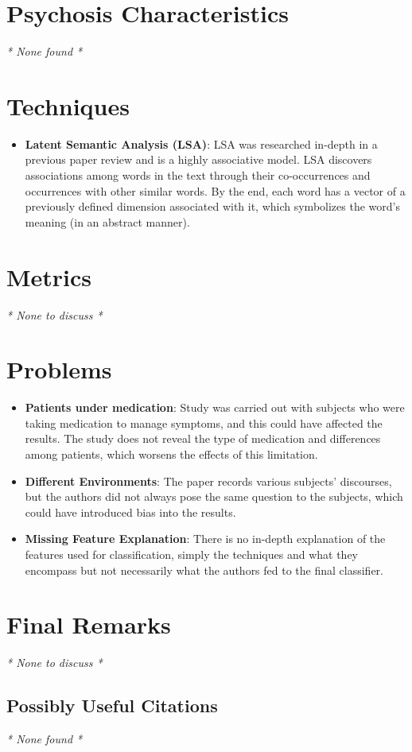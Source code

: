 \documentclass{Paper_Summary}
\begin{document}
\breakline

\newpage

\section{Psychosis Characteristics}
\emph{* None found *}

\section{Techniques}
    \begin{itemize}
        \item \textbf{Latent Semantic Analysis (LSA)}: LSA was researched in-depth in a previous paper review and is a highly associative model. LSA discovers associations among words in the text through their co-occurrences and occurrences with other similar words. By the end, each word has a vector of a previously defined dimension associated with it, which symbolizes the word's meaning (in an abstract manner).
    \end{itemize}

\section{Metrics}
\emph{* None to discuss *}

\section{Problems}
    \begin{itemize}
        \item \textbf{Patients under medication}: Study was carried out with subjects who were taking medication to manage symptoms, and this could have affected the results. The study does not reveal the type of medication and differences among patients, which worsens the effects of this limitation.
        \item \textbf{Different Environments}: The paper records various subjects' discourses, but the authors did not always pose the same question to the subjects, which could have introduced bias into the results.
        \item \textbf{Missing Feature Explanation}: There is no in-depth explanation of the features used for classification, simply the techniques and what they encompass but not necessarily what the authors fed to the final classifier.
    \end{itemize}


\section{Final Remarks}
\emph{* None to discuss *}

\breakline

\begin{center}
    \section*{Possibly Useful Citations}
\end{center}
\emph{* None found *}
\end{document}
